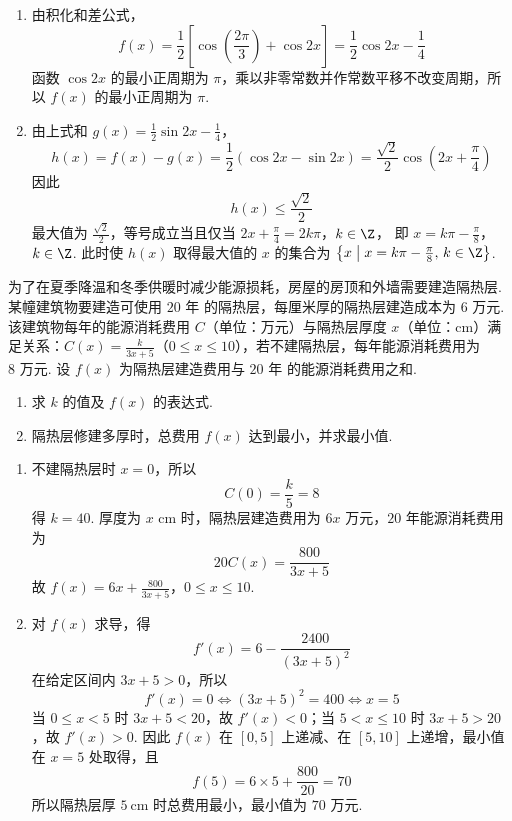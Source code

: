 \begin{solution}
\begin{enumerate}
\item 由积化和差公式，
\[
f(x)=\frac12\left[\cos\left(\frac{2\pi}{3}\right)+\cos2x\right]
=\frac12\cos2x-\frac14
\]
函数 \(\cos2x\) 的最小正周期为 \(\pi\)，乘以非零常数并作常数平移不改变周期，所以 \(f(x)\) 的最小正周期为 \(\pi\).

\item 由上式和 \(g(x)=\frac12\sin2x-\frac14\)，
\[
h(x)=f(x)-g(x)
=\frac12(\cos2x-\sin2x)
=\frac{\sqrt2}{2}\cos\left(2x+\frac\pi4\right)
\]
因此
\[
h(x)\leqslant\frac{\sqrt2}{2}
\]
最大值为 \(\frac{\sqrt2}{2}\)，等号成立当且仅当
\(2x+\frac\pi4=2k\pi\)，\(k\in\Z\)，
即
\(x=k\pi-\frac\pi8\)，\(k\in\Z\).
此时使 \(h(x)\) 取得最大值的 \(x\) 的集合为 \(\left\{x\mathrel{}\middle|\mathrel{}x=k\pi-\frac\pi8,\,k\in\Z\right\}\).
\end{enumerate}
\end{solution}

\begin{problem}
为了在夏季降温和冬季供暖时减少能源损耗，房屋的房顶和外墙需要建造隔热层. 某幢建筑物要建造可使用 \(20\text{ 年}\) 的隔热层，每厘米厚的隔热层建造成本为 \(6\text{ 万元}\). 该建筑物每年的能源消耗费用 \(C\)（单位：万元）与隔热层厚度 \(x\)（单位：cm）满足关系：\(C(x) = \frac{k}{3x + 5}\)（\(0 \leqslant x \leqslant 10\)），若不建隔热层，每年能源消耗费用为 \(8\text{ 万元}\). 设 \( f(x) \) 为隔热层建造费用与 \(20\text{ 年}\) 的能源消耗费用之和.

\begin{enumerate}
\item 求 \(k\) 的值及 \( f(x) \) 的表达式.
\item 隔热层修建多厚时，总费用 \( f(x) \) 达到最小，并求最小值.
\end{enumerate}
\end{problem}

\begin{solution}
\begin{enumerate}
\item 不建隔热层时 \(x=0\)，所以
\[
C(0)=\frac{k}{5}=8
\]
得 \(k=40\). 厚度为 \(x\text{ cm}\) 时，隔热层建造费用为 \(6x\text{ 万元}\)，\(20\text{ 年}\)能源消耗费用为
\[
20C(x)=\frac{800}{3x+5}
\]
故
\(f(x)=6x+\frac{800}{3x+5}\)，\(0\leqslant x\leqslant10\).

\item 对 \(f(x)\) 求导，得
\[
f'(x)=6-\frac{2400}{(3x+5)^2}
\]
在给定区间内 \(3x+5>0\)，所以
\[
f'(x)=0
\Longleftrightarrow (3x+5)^2=400
\Longleftrightarrow x=5
\]
当 \(0\leqslant x<5\) 时 \(3x+5<20\)，故 \(f'(x)<0\)；当
\(5<x\leqslant10\) 时 \(3x+5>20\)，故 \(f'(x)>0\). 因此 \(f(x)\) 在
\([0,5]\) 上递减、在 \([5,10]\) 上递增，最小值在 \(x=5\) 处取得，且
\[
f(5)=6\times5+\frac{800}{20}=70
\]
所以隔热层厚 \(5 \mathrm{~cm}\) 时总费用最小，最小值为 \(70\text{ 万元}\).
\end{enumerate}
\end{solution}

